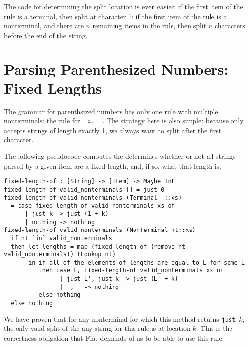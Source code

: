   The code for determining the split location is even easier: if the first item of the rule is a terminal, then split at character 1; if the first item of the rule is a nonterminal, and there are $n$ remaining items in the rule, then split $n$ characters before the end of the string.

  \section{Parsing Parenthesized Numbers: Fixed Lengths}
    The grammar for parenthsized numbers has only one rule with multiple nonterminals: the rule for ~$\Coloneqq$~~.  The strategy here is also simple: because  only accepts strings of length exactly 1, we always want to split after the first character.

    The following pseudocode computes the determines whether or not all strings parsed by a given item are a fixed length, and, if so, what that length is:
\begin{verbatim}
fixed-length-of : [String] -> [Item] -> Maybe Int
fixed-length-of valid_nonterminals [] = just 0
fixed-length-of valid_nonterminals (Terminal _::xs)
  = case fixed-length-of valid_nonterminals xs of
      | just k -> just (1 + k)
      | nothing -> nothing
fixed-length-of valid_nonterminals (NonTerminal nt::xs)
  if nt `in` valid_nonterminals
  then let lengths = map (fixed-length-of (remove nt valid_nonterminals)) (Lookup nt)
       in if all of the elements of lengths are equal to L for some L
          then case L, fixed-length-of valid_nonterminals xs of
                | just L', just k -> just (L' + k)
                | _, _ -> nothing
          else nothing
  else nothing
\end{verbatim}

    We have proven that for any nonterminal for which this method returns \texttt{just }$k$, the only valid split of the any string for this rule is at location $k$.  This is the correctness obligation that Fiat demands of us to be able to use this rule.


